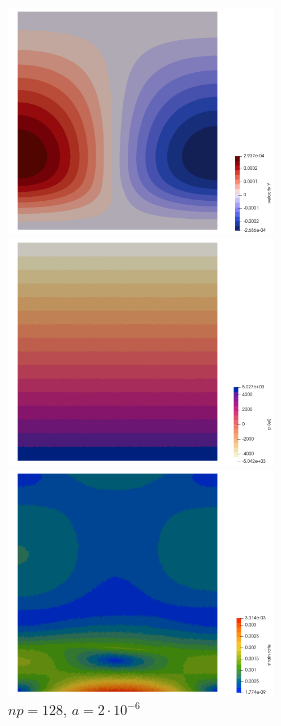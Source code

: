 \begin{center}
\includegraphics[width=7cm]{python_codes/fieldstone_93/results_exp4/v}\\
\includegraphics[width=7cm]{python_codes/fieldstone_93/results_exp4/press}
\includegraphics[width=7cm]{python_codes/fieldstone_93/results_exp4/sr}\\
{\captionfont $np=128$, $a=2\cdot10^{-6}$}
\end{center}



